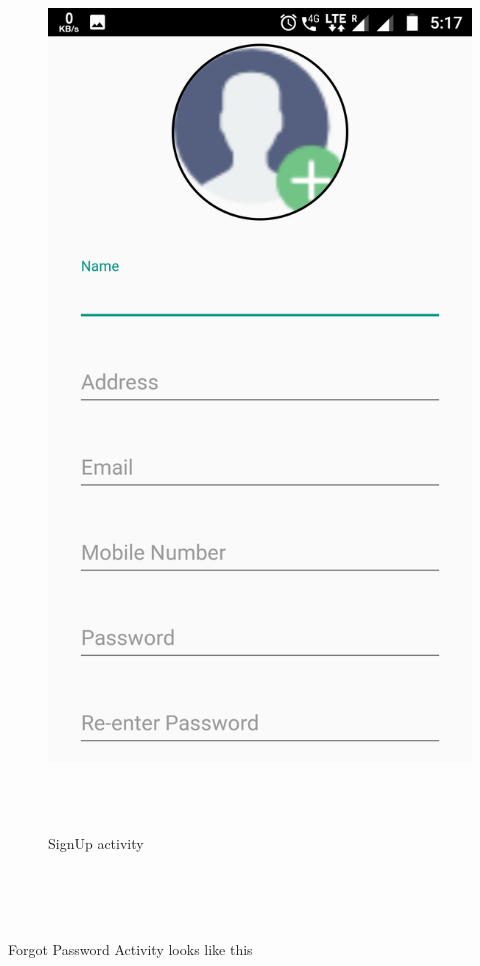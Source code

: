 \begin{figure}[h]
\centering
\includegraphics[width=0.7\linewidth]{s02}
\caption{SignUp activity}\\
\\
\end{figure}
\begin{text}
	\\
	\\
	\\
\end{text}	
Forgot Password Activity looks like this

